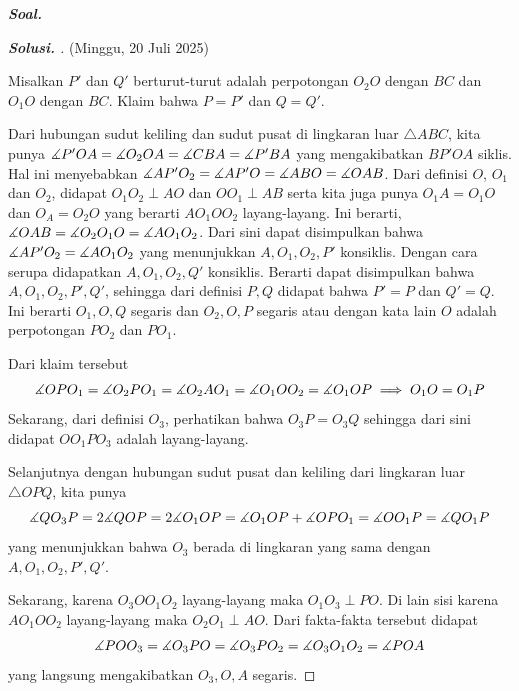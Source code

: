 \textbf{\textit{Soal.}} 

\begin{proof}[\textbf{Solusi. }] (Minggu, 20 Juli 2025) 
    
    Misalkan $P'$ dan $Q'$ berturut-turut adalah perpotongan $O_2O$ dengan $BC$ dan $O_1O$ dengan $BC$. 
    Klaim bahwa $P=P'$ dan $Q=Q'$. 
    
    
    Dari hubungan sudut keliling dan sudut pusat di lingkaran luar $\triangle ABC$, kita punya $\measuredangle P'OA = \measuredangle O_2OA = \measuredangle CBA = \measuredangle P'BA$ yang mengakibatkan $BP'OA$ siklis.
    Hal ini menyebabkan $\measuredangle AP'O_2 = \measuredangle AP'O = \measuredangle ABO = \measuredangle OAB$. 
    Dari definisi $O$, $O_1$ dan $O_2$, didapat $O_1O_2 \perp AO$ dan $OO_1 \perp AB$ serta kita juga punya $O_1A = O_1O$ dan $O_A = O_2O$ yang berarti $AO_1OO_2$ layang-layang. 
    Ini berarti, $\measuredangle OAB = \measuredangle O_2O_1O = \measuredangle AO_1O_2$. 
    Dari sini dapat disimpulkan bahwa $\measuredangle AP'O_2 = \measuredangle AO_1O_2$ yang menunjukkan $A,O_1,O_2,P'$ konsiklis. 
    Dengan cara serupa didapatkan $A,O_1,O_2,Q'$ konsiklis. 
    Berarti dapat disimpulkan bahwa  $A,O_1,O_2,P',Q'$, sehingga dari definisi $P,Q$ didapat bahwa $P'=P$ dan $Q'=Q$.
    Ini berarti $O_1, O, Q$ segaris dan $O_2, O, P$ segaris atau dengan kata lain $O$ adalah perpotongan $PO_2$ dan $PO_1$.
    
    Dari klaim tersebut 
    \[\measuredangle OPO_1 = \measuredangle O_2PO_1 = \measuredangle O_2AO_1 = \measuredangle O_1OO_2 = \measuredangle O_1OP \implies O_1O = O_1P \]
    Sekarang, dari definisi $O_3$, perhatikan bahwa $O_3P=O_3Q$ sehingga dari sini didapat $OO_1PO_3$ adalah layang-layang.


    Selanjutnya dengan hubungan sudut pusat dan keliling dari lingkaran luar $\triangle OPQ$, kita punya
    \[\measuredangle QO_3P = 2\measuredangle QOP = 2\measuredangle O_1OP = \measuredangle O_1OP + \measuredangle OPO_1 = \measuredangle OO_1P = \measuredangle QO_1P\]
    yang menunjukkan bahwa $O_3$ berada di lingkaran yang sama dengan $A,O_1,O_2,P',Q'$.

    
    Sekarang, karena $O_3OO_1O_2$ layang-layang maka $O_1O_3 \perp PO$. Di lain sisi karena $AO_1OO_2$ layang-layang maka $O_2O_1 \perp AO$. Dari fakta-fakta tersebut didapat
    \[\measuredangle POO_3 = \measuredangle O_3PO = \measuredangle O_3PO_2 = \measuredangle O_3O_1O_2 = \measuredangle POA \]
    yang langsung mengakibatkan $O_3, O, A$ segaris.
\end{proof}
